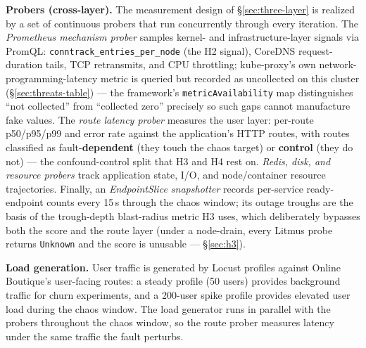 \textbf{Probers (cross-layer).} The measurement design of \S\ref{sec:three-layer} is realized by a
set of continuous probers that run concurrently through every iteration. The
\emph{Prometheus mechanism prober} samples kernel- and infrastructure-layer
signals via PromQL: \texttt{conntrack\_entries\_per\_node} (the H2 signal), CoreDNS
request-duration tails, TCP retransmits, and CPU throttling; kube-proxy's own
network-programming-latency metric is queried but recorded as uncollected on
this cluster (\S\ref{sec:threats-table}) --- the framework's \texttt{metricAvailability} map distinguishes
``not collected'' from ``collected zero'' precisely so such gaps cannot
manufacture fake values. The \emph{route latency prober} measures the user layer:
per-route p50/p95/p99 and error rate against the application's HTTP routes,
with routes classified as fault-\textbf{dependent} (they touch the chaos target)
or \textbf{control} (they do not) --- the confound-control split that H3 and H4
rest on. \emph{Redis, disk, and resource probers} track application state, I/O,
and node/container resource trajectories. Finally, an \emph{EndpointSlice
snapshotter} records per-service ready-endpoint counts every 15\,s through
the chaos window; its outage troughs are the basis of the trough-depth
blast-radius metric H3 uses, which deliberately bypasses both the score and the
route layer (under a node-drain, every Litmus probe returns \texttt{Unknown} and
the score is unusable --- \S\ref{sec:h3}).

\textbf{Load generation.} User traffic is generated by Locust profiles against
Online Boutique's user-facing routes: a steady profile (50 users) provides
background traffic for churn experiments, and a 200-user spike profile
provides elevated user load during the chaos window. The load generator runs in
parallel with the probers throughout the chaos window, so the route prober
measures latency under the same traffic the fault perturbs.

